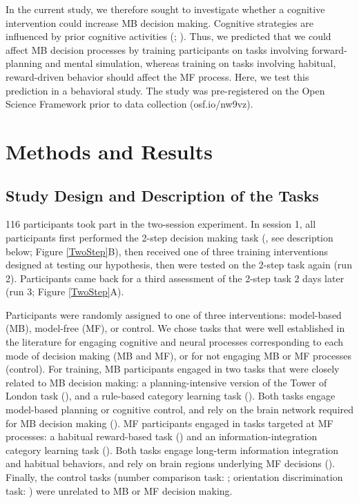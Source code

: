 \documentclass[11pt]{article} %
\begin{document}
In the current study, we therefore sought to investigate whether a cognitive intervention could increase MB decision making. Cognitive strategies are influenced by prior cognitive activities (\cite{jaeggi_short-_2011}; \cite{muraven_self-regulation_2000}). Thus, we predicted that we could affect MB decision processes by training participants on tasks involving forward-planning and mental simulation, whereas training on tasks involving habitual, reward-driven behavior should affect the MF process. Here, we test this prediction in a behavioral study. The study was pre-registered on the Open Science Framework prior to data collection (osf.io/nw9vz).

\section{Methods and Results}
\subsection{Study Design and Description of the Tasks}

116 participants took part in the two-session experiment. In session 1, all participants first performed the 2-step decision making task (\cite{daw_model-based_2011}, see description below; Figure \ref{TwoStep}B), then received one of three training interventions designed at testing our hypothesis, then were tested on the 2-step task again (run 2). Participants came back for a third assessment of the 2-step task 2 days later (run 3; Figure \ref{TwoStep}A).%

Participants were randomly assigned to one of three interventions: model-based (MB), model-free (MF), or control. We chose tasks that were well established in the literature for engaging cognitive and neural processes corresponding to each mode of decision making (MB and MF), or for not engaging MB or MF processes (control). For training, MB participants engaged in two tasks that were closely related to MB decision making: a planning-intensive version of the Tower of London task (\cite{beauchamp_dynamic_2003}), and a rule-based category learning task (\cite{maddox_dissociating_2004}). Both tasks engage model-based planning or cognitive control, and rely on the brain network required for MB decision making (\cite{dolan_goals_2013}). MF participants engaged in tasks targeted at MF processes: a habitual reward-based task (\cite{tricomi_value_2015}) and an information-integration category learning task (\cite{maddox_dissociating_2004}). Both tasks engage long-term information integration and habitual behaviors, and rely on brain regions underlying MF decisions (\cite{dolan_goals_2013}). Finally, the control tasks (number comparison task: \cite{piazza_neurocognitive_2010}; orientation discrimination task: \cite{sasaki_advances_2010}) were unrelated to MB or MF decision making. 
\end{document}
